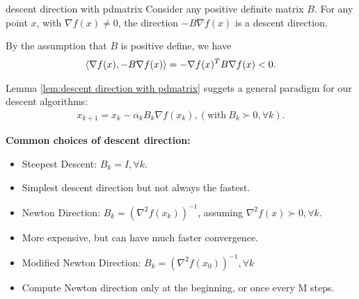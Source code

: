 \begin{lemma}{}{descent direction with pdmatrix}
    Consider any positive definite matrix $B$. For any point $x$, 
 with $\nabla f(x)\neq 0$, the direction $-B\nabla f(x)$ is a descent direction. 
\end{lemma}
\begin{proofsolution}
    By the assumption that $B$ is positive define, we have 
    \begin{align*}
        \langle\nabla f(x),-B\nabla f(x)\rangle=-\nabla f(x)^TB\nabla f(x)<0.
    \end{align*}
\end{proofsolution}

Lemma \ref{lem:descent direction with pdmatrix} suggets a general paradigm for our descent algorithms:
\begin{align*}
    x_{k+1} = x_k - \alpha_k B_k \nabla f(x_k), (\text{with}\ B_k\succ 0, \forall k).
\end{align*}

\noindent \textbf{Common choices of descent direction:}
\begin{itemize}
    \item Steepest Descent: $B_k=I,\forall k$.
    \item[] Simplest descent direction but not always the fastest.
    \item  Newton Direction: $B_k=(\nabla^2 f(x_k))^{-1}$, assuming $\nabla^2 f(x)\succ 0, \forall k$.
    \item[]  More expensive, but can have much faster convergence.
    \item Modified Newton Direction: $B_k=(\nabla^2f(x_0))^{-1},\forall k$
    \item[] Compute Newton direction only at the beginning, or once every M steps.
\end{itemize}

